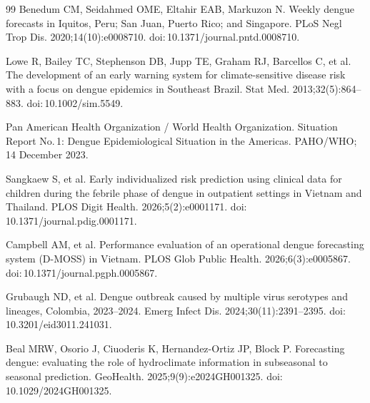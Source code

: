 \documentclass[11pt,a4paper]{article}
\begin{document}
\begin{thebibliography}{99}
 Benedum CM, Seidahmed OME, Eltahir EAB, Markuzon N. Weekly dengue forecasts in Iquitos, Peru; San Juan, Puerto Rico; and Singapore. PLoS Negl Trop Dis. 2020;14(10):e0008710. doi:\,10.1371/journal.pntd.0008710.

 Lowe R, Bailey TC, Stephenson DB, Jupp TE, Graham RJ, Barcellos C, et al. The development of an early warning system for climate-sensitive disease risk with a focus on dengue epidemics in Southeast Brazil. Stat Med. 2013;32(5):864--883. doi:\,10.1002/sim.5549.

 Pan American Health Organization / World Health Organization. Situation Report No.\,1: Dengue Epidemiological Situation in the Americas. PAHO/WHO; 14 December 2023.

 Sangkaew S, et al. Early individualized risk prediction using clinical data for children during the febrile phase of dengue in outpatient settings in Vietnam and Thailand. PLOS Digit Health. 2026;5(2):e0001171. doi:\,10.1371/journal.pdig.0001171.

 Campbell AM, et al. Performance evaluation of an operational dengue forecasting system (D-MOSS) in Vietnam. PLOS Glob Public Health. 2026;6(3):e0005867. doi:\,10.1371/journal.pgph.0005867.

 Grubaugh ND, et al. Dengue outbreak caused by multiple virus serotypes and lineages, Colombia, 2023--2024. Emerg Infect Dis. 2024;30(11):2391--2395. doi:\,10.3201/eid3011.241031.

 Beal MRW, Osorio J, Ciuoderis K, Hernandez-Ortiz JP, Block P. Forecasting dengue: evaluating the role of hydroclimate information in subseasonal to seasonal prediction. GeoHealth. 2025;9(9):e2024GH001325. doi:\,10.1029/2024GH001325.

\end{thebibliography}
\endgroup

\clearpage
\end{document}
